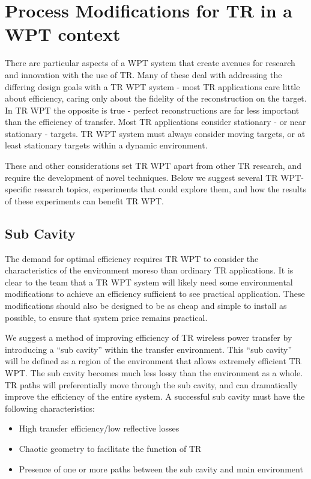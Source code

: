 \section{Process Modifications for TR in a WPT context}
\label{sec:future-wpt}

There are particular aspects of a WPT system that create avenues for research and innovation with the use of TR. Many of these deal with addressing the differing design goals with a TR WPT system - most TR applications care little about efficiency, caring only about the fidelity of the reconstruction on the target. In TR WPT the opposite is true - perfect reconstructions are far less important than the efficiency of transfer. Most TR applications consider stationary - or near stationary - targets. TR WPT system must always consider moving targets, or at least stationary targets within a dynamic environment.

These and other considerations set TR WPT apart from other TR research, and require the development of novel techniques. Below we suggest several TR WPT-specific research topics, experiments that could explore them, and how the results of these experiments can benefit TR WPT.

\subsection{Sub Cavity}

The demand for optimal efficiency requires TR WPT to consider the characteristics of the environment moreso than ordinary TR applications. It is clear to the team that a TR WPT system will likely need some environmental modifications to achieve an efficiency sufficient to see practical application. These modifications should also be designed to be as cheap and simple to install as possible, to ensure that system price remains practical.

We suggest a method of improving efficiency of TR wireless power transfer by introducing a ``sub cavity'' within the transfer environment. This ``sub cavity'' will be defined as a region of the environment that allows extremely efficient TR WPT. The sub cavity becomes much less lossy than the environment as a whole. TR paths will preferentially move through the sub cavity, and can dramatically improve the efficiency of the entire system. A successful sub cavity must have the following characteristics:

\begin{itemize}
  \item High transfer efficiency/low reflective losses
  \item Chaotic geometry to facilitate the function of TR
  \item Presence of one or more paths between the sub cavity and main environment
\end{itemize}

